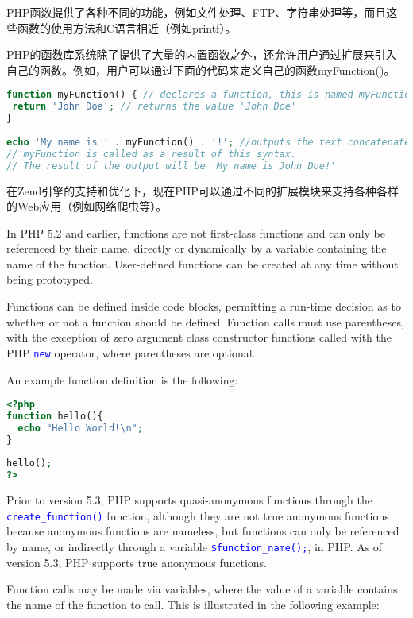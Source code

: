 PHP函数提供了各种不同的功能，例如文件处理、FTP、字符串处理等，而且这些函数的使用方法和C语言相近（例如printf）。

PHP的函数库系统除了提供了大量的内置函数之外，还允许用户通过扩展来引入自己的函数。例如，用户可以通过下面的代码来定义自己的函数myFunction()。


\begin{lstlisting}[language=PHP]
function myFunction() { // declares a function, this is named myFunction
 return 'John Doe'; // returns the value 'John Doe'
}
 
echo 'My name is ' . myFunction() . '!'; //outputs the text concatenated with the return value of myFunction.
// myFunction is called as a result of this syntax.
// The result of the output will be 'My name is John Doe!'
\end{lstlisting}

在Zend引擎的支持和优化下，现在PHP可以通过不同的扩展模块来支持各种各样的Web应用（例如网络爬虫等）。

In PHP 5.2 and earlier, functions are not first-class functions and can only be referenced by their name, directly or dynamically by a variable containing the name of the function. User-defined functions can be created at any time without being prototyped. 

Functions can be defined inside code blocks, permitting a run-time decision as to whether or not a function should be defined. Function calls must use parentheses, with the exception of zero argument class constructor functions called with the PHP \textcolor{Blue}{\texttt{new}} operator, where parentheses are optional. 

An example function definition is the following:

\begin{lstlisting}[language=PHP]
<?php
function hello(){
  echo "Hello World!\n";
}
 
hello();
?>
\end{lstlisting}

Prior to version 5.3, PHP supports quasi-anonymous functions through the \textcolor{Blue}{\texttt{create\_function()}} function, although they are not true anonymous functions because anonymous functions are nameless, but functions can only be referenced by name, or indirectly through a variable \textcolor{Blue}{\texttt{\$function\_name();}}, in PHP. As of version 5.3, PHP supports true anonymous functions.


Function calls may be made via variables, where the value of a variable contains the name of the function to call. This is illustrated in the following example:

